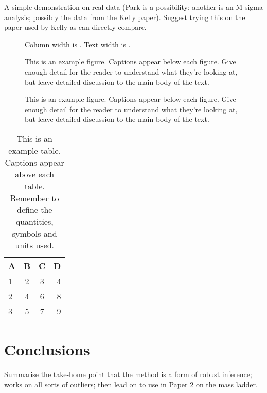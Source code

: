 \documentclass[fleqn,usenatbib]{mnras}
\begin{document}
A simple demonstration on real data (Park is a possibility; another is an
M-sigma analysis; possibly the data from the Kelly paper).  Suggest trying this
on the paper used by Kelly as can directly compare.

\begin{figure}
    Column width is \the\columnwidth.
    Text width is \the\textwidth.
    \caption{This is an example figure. Captions appear below each figure.
	Give enough detail for the reader to understand what they're looking at,
	but leave detailed discussion to the main body of the text.}
    \label{fig:example_figure}
\end{figure}

\begin{figure*}
    \the\textwidth
    \caption{This is an example figure. Captions appear below each figure.
	Give enough detail for the reader to understand what they're looking at,
	but leave detailed discussion to the main body of the text.}
    \label{fig:example_widefigure}
\end{figure*}

\begin{table}
	\centering
	\caption{This is an example table. Captions appear above each table.
	Remember to define the quantities, symbols and units used.}
	\label{tab:example_table}
	\begin{tabular}{lccr} %
		\hline
		A & B & C & D\\
		\hline
		1 & 2 & 3 & 4\\
		2 & 4 & 6 & 8\\
		3 & 5 & 7 & 9\\
		\hline
	\end{tabular}
\end{table}


\section{Conclusions}

Summarise the take-home point that the method is a form of robust inference;
works on all sorts of outliers; then lead on to use in Paper 2 on the mass
ladder.
\end{document}
